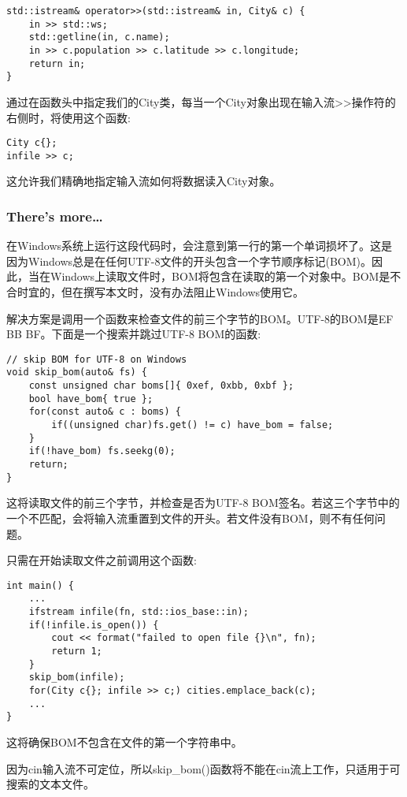 \begin{lstlisting}[style=styleCXX]
std::istream& operator>>(std::istream& in, City& c) {
	in >> std::ws;
	std::getline(in, c.name);
	in >> c.population >> c.latitude >> c.longitude;
	return in;
}
\end{lstlisting}

通过在函数头中指定我们的City类，每当一个City对象出现在输入流>{}>操作符的右侧时，将使用这个函数:

\begin{lstlisting}[style=styleCXX]
City c{};
infile >> c;
\end{lstlisting}

这允许我们精确地指定输入流如何将数据读入City对象。

\subsubsection{There's more…}

在Windows系统上运行这段代码时，会注意到第一行的第一个单词损坏了。这是因为Windows总是在任何UTF-8文件的开头包含一个字节顺序标记(BOM)。因此，当在Windows上读取文件时，BOM将包含在读取的第一个对象中。BOM是不合时宜的，但在撰写本文时，没有办法阻止Windows使用它。

解决方案是调用一个函数来检查文件的前三个字节的BOM。UTF-8的BOM是EF BB BF。下面是一个搜索并跳过UTF-8 BOM的函数:

\begin{lstlisting}[style=styleCXX]
// skip BOM for UTF-8 on Windows
void skip_bom(auto& fs) {
	const unsigned char boms[]{ 0xef, 0xbb, 0xbf };
	bool have_bom{ true };
	for(const auto& c : boms) {
		if((unsigned char)fs.get() != c) have_bom = false;
	}
	if(!have_bom) fs.seekg(0);
	return;
}
\end{lstlisting}

这将读取文件的前三个字节，并检查是否为UTF-8 BOM签名。若这三个字节中的一个不匹配，会将输入流重置到文件的开头。若文件没有BOM，则不有任何问题。

只需在开始读取文件之前调用这个函数:

\begin{lstlisting}[style=styleCXX]
int main() {
	...
	ifstream infile(fn, std::ios_base::in);
	if(!infile.is_open()) {
		cout << format("failed to open file {}\n", fn);
		return 1;
	}
	skip_bom(infile);
	for(City c{}; infile >> c;) cities.emplace_back(c);
	...
}
\end{lstlisting}

这将确保BOM不包含在文件的第一个字符串中。

\begin{tcolorbox}[colback=webgreen!5!white,colframe=webgreen!75!black,title=Note]
因为cin输入流不可定位，所以skip\_bom()函数将不能在cin流上工作，只适用于可搜索的文本文件。
\end{tcolorbox}











